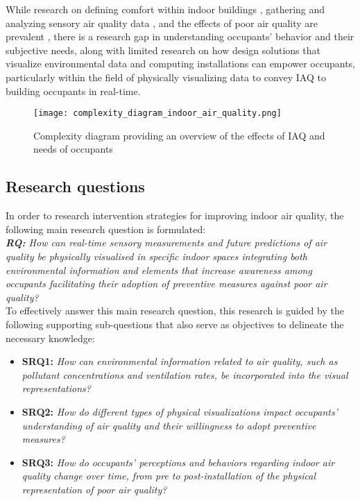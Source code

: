 While research on defining comfort within indoor buildings \cite{alavi_comfort_2017}, gathering and analyzing sensory air quality data \cite{corlan_importance_2021}, and the effects of poor air quality are prevalent \cite{klepeis_national_2001}, there is a research gap in understanding occupants' behavior and their subjective needs, along with limited research on how design solutions that visualize environmental data and computing installations can empower occupants, particularly within the field of physically visualizing data to convey IAQ to building occupants in real-time. 

\begin{figure}[h]
    \centering
    \texttt{[image: complexity\_diagram\_indoor\_air\_quality.png]}
    \caption{Complexity diagram providing an overview of the effects of IAQ and needs of occupants \cite{schweizer_indoor_2007, wang_how_2021, kim_analyzing_2019, alavi_comfort_2017, corlan_importance_2021, klepeis_national_2001}}
    \label{fig:complexity}
\end{figure}



\subsection{Research questions}

In order to research intervention strategies for improving indoor air quality, the following main research question is formulated: \\

\emph{\textbf{RQ:} How can real-time sensory measurements and future predictions of air quality be physically visualised in specific indoor spaces integrating both environmental information and elements that increase awareness among occupants facilitating their adoption of preventive measures against poor air quality?} \\

To effectively answer this main research question, this research is guided by the following supporting sub-questions that also serve as objectives to delineate the necessary knowledge: \\

\begin{itemize}
    \item \textbf{SRQ1:} \emph{How can environmental information related to air quality, such as pollutant concentrations and ventilation rates, be incorporated into the visual representations?}
    \item \textbf{SRQ2:} \emph{How do different types of physical visualizations impact occupants' understanding of air quality and their willingness to adopt preventive measures?}
    \item \textbf{SRQ3:} \emph{How do occupants' perceptions and behaviors regarding indoor air quality change over time, from pre to post-installation of the physical representation of poor air quality?}\\
\end{itemize}